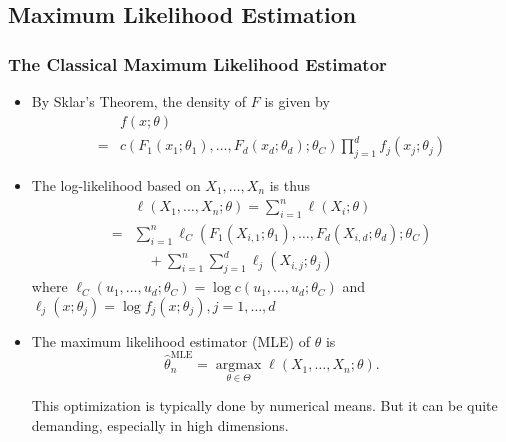 \subsection*{Maximum Likelihood Estimation}
\subsubsection*{The Classical Maximum Likelihood Estimator}
\begin{itemize}[leftmargin=*]
    \item By Sklar's Theorem, the density of $F$ is given by
$$
\begin{aligned}
&f(x ; \theta) \\
=&c\left(F_{1}\left(x_{1} ; \theta_{1}\right), \ldots, F_{d}\left(x_{d} ; \theta_{d}\right) ; \theta_{C}\right) \prod_{j=1}^{d} f_{j}\left(x_{j} ; \theta_{j}\right)
\end{aligned}
$$
    \item The log-likelihood based on $X_{1}, \ldots, X_{n}$ is thus
$$
\begin{aligned}
&\ell\left(X_{1}, \ldots, X_{n} ; \theta\right)=\sum_{i=1}^{n} \ell\left(X_{i} ; \theta\right) \\
=&\sum_{i=1}^{n} \ell_{C}\left(F_{1}\left(X_{i, 1} ; \theta_{1}\right), \ldots, F_{d}\left(X_{i, d} ; \theta_{d}\right) ; \theta_{C}\right) \\
& \quad +\sum_{i=1}^{n} \sum_{j=1}^{d} \ell_{j}\left(X_{i, j} ; \theta_{j}\right)
\end{aligned}
$$
where $\ell_{C}\left(u_{1}, \ldots, u_{d} ; \theta_{C}\right)=\log c\left(u_{1}, \ldots, u_{d} ; \theta_{C}\right)$ and $\ell_{j}\left(x ; \theta_{j}\right)=\log f_{j}\left(x ; \theta_{j}\right), j=1, \ldots, d$
    \item The maximum likelihood estimator (MLE) of $\theta$ is
$$
\hat{\theta}_{n}^{\mathrm{MLE}}=\underset{\theta \in \Theta}{\operatorname{argmax}} \ell\left(X_{1}, \ldots, X_{n} ; \theta\right) .
$$

This optimization is typically done by numerical means. But it can be quite demanding, especially in high dimensions.
\end{itemize}



